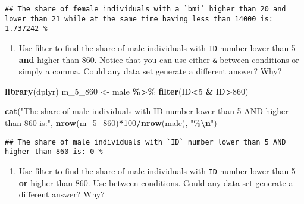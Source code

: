 \documentclass[
]{book}
\newenvironment{Shaded}{\begin{snugshade}}{\end{snugshade}}
\newcommand{\DecValTok}[1]{\textcolor[rgb]{0.00,0.00,0.81}{#1}}
\newcommand{\FunctionTok}[1]{\textcolor[rgb]{0.13,0.29,0.53}{\textbf{#1}}}
\newcommand{\NormalTok}[1]{#1}
\newcommand{\OtherTok}[1]{\textcolor[rgb]{0.56,0.35,0.01}{#1}}
\newcommand{\SpecialCharTok}[1]{\textcolor[rgb]{0.81,0.36,0.00}{\textbf{#1}}}
\newcommand{\StringTok}[1]{\textcolor[rgb]{0.31,0.60,0.02}{#1}}
\providecommand{\tightlist}{%
  \setlength{\itemsep}{0pt}\setlength{\parskip}{0pt}}
\begin{document}
\begin{verbatim}
## The share of female individuals with a `bmi` higher than 20 and lower than 21 while at the same time having less than 14000 is: 1.737242 %
\end{verbatim}

\begin{enumerate}
\def\labelenumi{\arabic{enumi}.}
\setcounter{enumi}{7}
\tightlist
\item
  Use filter to find the share of male individuals with \texttt{ID} number lower than 5 \textbf{and} higher than 860. Notice that you can use either \texttt{\&} between conditions or simply a comma. Could any data set generate a different answer? Why?
\end{enumerate}

\begin{Shaded}
\begin{Highlighting}[]
\FunctionTok{library}\NormalTok{(dplyr)}
\NormalTok{m\_5\_860 }\OtherTok{\textless{}{-}}\NormalTok{ male }\SpecialCharTok{\%\textgreater{}\%}
  \FunctionTok{filter}\NormalTok{(ID}\SpecialCharTok{\textless{}}\DecValTok{5} \SpecialCharTok{\&}\NormalTok{ ID}\SpecialCharTok{\textgreater{}}\DecValTok{860}\NormalTok{)}

\FunctionTok{cat}\NormalTok{(}\StringTok{"The share of male individuals with \textasciigrave{}ID\textasciigrave{} number lower than 5 AND higher than 860 is:"}\NormalTok{, }\FunctionTok{nrow}\NormalTok{(m\_5\_860)}\SpecialCharTok{*}\DecValTok{100}\SpecialCharTok{/}\FunctionTok{nrow}\NormalTok{(male), }\StringTok{"\%}\SpecialCharTok{\textbackslash{}n}\StringTok{"}\NormalTok{)}
\end{Highlighting}
\end{Shaded}

\begin{verbatim}
## The share of male individuals with `ID` number lower than 5 AND higher than 860 is: 0 %
\end{verbatim}

\begin{enumerate}
\def\labelenumi{\arabic{enumi}.}
\setcounter{enumi}{8}
\tightlist
\item
  Use filter to find the share of male individuals with \texttt{ID} number lower than 5 \textbf{or} higher than 860. Use \texttt{\textbar{}} between conditions. Could any data set generate a different answer? Why?
\end{enumerate}
\end{document}
